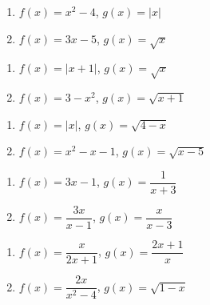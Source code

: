 \begin{multicols}{2}
\begin{enumerate}
\setcounter{enumi}{\value{HW}}

\item  $f(x) = x^2-4$, $g(x) = |x|$
\item  $f(x) = 3x-5$, $g(x) = \sqrt{x}$ 

\setcounter{HW}{\value{enumi}}
\end{enumerate}
\end{multicols}

\begin{multicols}{2}
\begin{enumerate}
\setcounter{enumi}{\value{HW}}

\item  $f(x) = |x+1|$, $g(x) = \sqrt{x}$
\item  $f(x) = 3-x^2$, $g(x) = \sqrt{x+1}$ 

\setcounter{HW}{\value{enumi}}
\end{enumerate}
\end{multicols}

\begin{multicols}{2}
\begin{enumerate}
\setcounter{enumi}{\value{HW}}

\item  $f(x) = |x|$, $g(x) = \sqrt{4-x}$
\item  $f(x) = x^2-x-1$, $g(x) = \sqrt{x-5}$ 

\setcounter{HW}{\value{enumi}}
\end{enumerate}
\end{multicols}

\begin{multicols}{2}
\begin{enumerate}
\setcounter{enumi}{\value{HW}}

\item  $f(x) = 3x-1$, $g(x) = \dfrac{1}{x+3}$
\item  $f(x) = \dfrac{3x}{x-1}$, $g(x) =\dfrac{x}{x-3}$

\setcounter{HW}{\value{enumi}}
\end{enumerate}
\end{multicols}

\begin{multicols}{2}
\begin{enumerate}
\setcounter{enumi}{\value{HW}}

\item  $f(x) = \dfrac{x}{2x+1}$, $g(x) = \dfrac{2x+1}{x}$
\item  $f(x) =  \dfrac{2x}{x^2-4}$, $g(x) =\sqrt{1-x}$ 
 \label{funccompexp1last}

\setcounter{HW}{\value{enumi}}
\end{enumerate}
\end{multicols}

